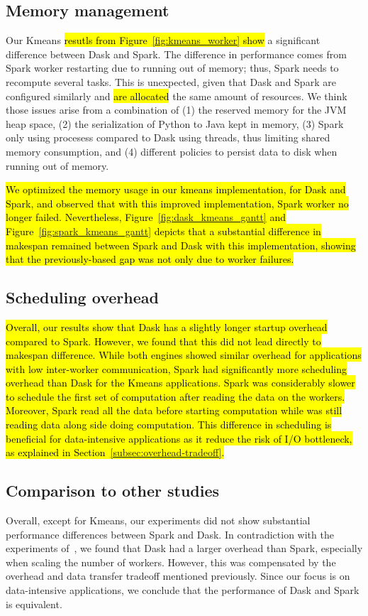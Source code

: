 \documentclass[AMA,STIX1COL]{WileyNJD-v2}
\newcommand{\HL}[1]{\hl{#1}}
\begin{document}
\subsection{Memory management}
Our Kmeans \HL{resutls from Figure~{\ref{fig:kmeans_worker}} show} a significant difference between Dask and Spark.
The difference in performance comes from Spark worker restarting due to running out of memory; thus, Spark needs to recompute several tasks.
This is unexpected, given that Dask and Spark are configured similarly and \HL{are allocated} the same amount of resources.
We think those issues arise from a combination of
(1) the reserved memory for the JVM heap space,
(2) the serialization of Python to Java kept in memory,
(3) Spark only using procesess compared to Dask using threads, thus limiting shared memory consumption,
and (4) different policies to persist data to disk when running out of memory.

\HL{
	We optimized the memory usage in our kmeans implementation, for Dask and Spark,
	and observed that with this improved implementation, Spark worker no longer failed.
	Nevertheless, Figure~{\ref{fig:dask_kmeans_gantt}} and Figure~{\ref{fig:spark_kmeans_gantt}} depicts that a substantial difference in makespan remained between Spark and Dask with this implementation,
	showing that the previously-based gap was not only due to worker failures.
}

\subsection{Scheduling overhead}
\HL{
	Overall, our results show that Dask has a slightly longer startup overhead compared to Spark.
	However, we found that this did not lead directly to makespan difference.
	While both engines showed similar overhead for applications with low inter-worker communication,
	Spark had significantly more scheduling overhead than Dask for the Kmeans applications.
	Spark was considerably slower to schedule the first set of computation after reading the data on the workers.
	Moreover, Spark read all the data before starting computation while was still reading data along side doing computation.
	This difference in scheduling is beneficial for data-intensive applications as it reduce the risk
	of I/O bottleneck, as explained in Section~{\ref{subsec:overhead-tradeoff}}.
}
										
\subsection{Comparison to other studies}
Overall, except for Kmeans, our experiments did not show substantial performance differences between Spark and Dask.
In contradiction with the experiments of~\cite{Mehta:17}, we found that Dask had a larger overhead than Spark, especially when scaling the number of workers.
However, this was compensated by the overhead and data transfer tradeoff mentioned previously.
Since our focus is on data-intensive applications, we conclude that the performance of Dask and Spark is equivalent.
										
\end{document}
